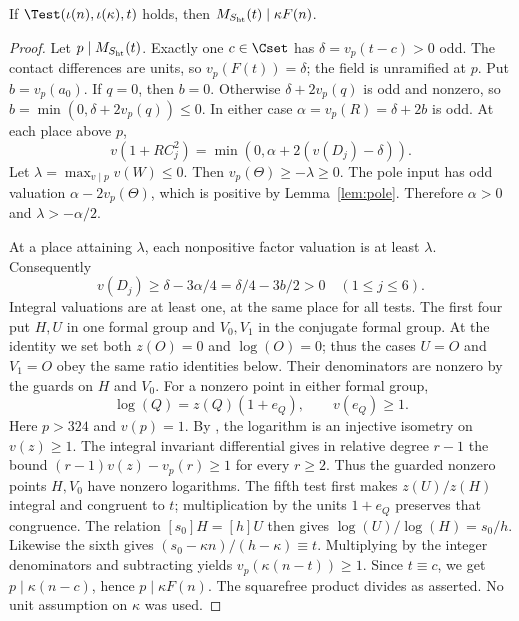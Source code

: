 \begin{lemma}[Divisibility]\label{lem:test}
If $\Test(\iota(n),\iota(\kappa),t)$ holds, then
$M_{S_{\rm ht}}(t)\mid\kappa F(n)$.
\end{lemma}
\begin{proof}
Let $p\mid M_{S_{\rm ht}}(t)$. Exactly one $c\in\Cset$ has
$\delta=v_p(t-c)>0$ odd. The contact differences are units, so
$v_p(F(t))=\delta$; the field is unramified at $p$. Put $b=v_p(a_0)$.
If $q=0$, then $b=0$. Otherwise $\delta+2v_p(q)$ is odd and
nonzero, so $b=\min(0,\delta+2v_p(q))\le0$. In either case
$\alpha=v_p(R)=\delta+2b$ is odd. At each place above $p$,
\[
 v(1+RC_j^2)=\min(0,\alpha+2(v(D_j)-\delta)).
\]
Let $\lambda=\max_{v\mid p}v(W)\le0$. Then
$v_p(\Theta)\ge-\lambda\ge0$. The pole input has odd valuation
$\alpha-2v_p(\Theta)$, which is positive by Lemma~\ref{lem:pole}.
Therefore $\alpha>0$ and $\lambda> -\alpha/2$.

At a place attaining $\lambda$, each nonpositive factor valuation is
at least $\lambda$. Consequently
\[
 v(D_j)\ge\delta-3\alpha/4=\delta/4-3b/2>0
 \quad(1\le j\le6).
\]
Integral valuations are at least one, at the same place for all tests.
The first four put $H,U$ in one formal group and $V_0,V_1$ in the
conjugate formal group. At the identity we set both $z(O)=0$ and
$\log(O)=0$; thus the cases $U=O$ and $V_1=O$ obey the same ratio
identities below. Their denominators are nonzero by the guards on
$H$ and $V_0$. For a nonzero point in either formal group,
\[
 \log(Q)=z(Q)(1+e_Q),\qquad v(e_Q)\ge1.
\]
Here $p>324$ and $v(p)=1$. By
\cite[IV.5.5 and IV.6.4, pp.~129--132]{silverman},
the logarithm is an injective isometry on $v(z)\ge1$.
The integral invariant differential gives in relative degree $r-1$
the bound $(r-1)v(z)-v_p(r)\ge1$ for every $r\ge2$.
Thus the guarded nonzero points $H,V_0$ have nonzero logarithms.
The fifth test first makes $z(U)/z(H)$ integral and congruent to
$t$; multiplication by the units $1+e_Q$ preserves that congruence.
The relation $[s_0]H=[h]U$ then gives
$\log(U)/\log(H)=s_0/h$. Likewise the sixth gives
$(s_0-\kappa n)/(h-\kappa)\equiv t$.
Multiplying by the integer denominators and subtracting yields
$v_p(\kappa(n-t))\ge1$. Since $t\equiv c$, we get
$p\mid\kappa(n-c)$, hence $p\mid\kappa F(n)$. The squarefree
product divides as asserted. No unit assumption on $\kappa$ was used.
\end{proof}

